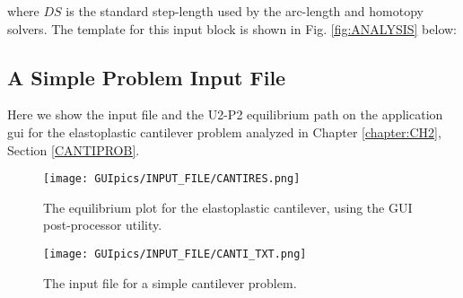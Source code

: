 \begin{appendices}
\noindent where $DS$ is the standard step-length used by the arc-length and 
homotopy solvers. The template for this input block is shown in Fig. 
\ref{fig:ANALYSIS} below:

\subsection*{A Simple Problem Input File}

Here we show the input file and the U2-P2 equilibrium path on the application 
\acrshort{gui} for the elastoplastic cantilever problem analyzed in Chapter 
\ref{chapter:CH2}, Section \ref{CANTIPROB}.
\begin{figure}
	\centering
	\texttt{[image: GUIpics/INPUT\_FILE/CANTIRES.png]}
	\caption{The equilibrium plot for the elastoplastic cantilever, using the 
		GUI post-processor utility.}
	\label{fig:RES}
\end{figure}

\begin{figure}
	\centering
	\texttt{[image: GUIpics/INPUT\_FILE/CANTI\_TXT.png]}
	\caption{The input file for a simple cantilever problem.}
	\label{fig:CANTINPUT}
\end{figure}

\end{appendices}